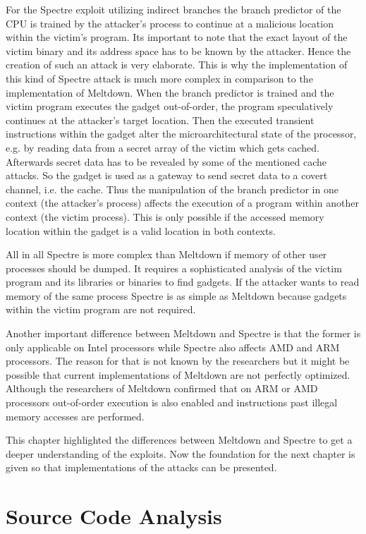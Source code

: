 \documentclass[a4paper,oneside,openright] {scrreprt}
\begin{document}
For the Spectre exploit utilizing indirect branches the branch predictor of the CPU is trained by the attacker's process 
to continue at a malicious location within the victim's program. 
Its important to note that the exact layout of the victim binary and its address space has to be known by the attacker.
Hence the creation of such an attack is very elaborate.
This is why the implementation of this kind of Spectre attack is much more complex in comparison to the implementation of Meltdown.
When the branch predictor is trained and the victim program executes the gadget out-of-order, 
the program speculatively continues at the attacker's target location.
Then the executed transient instructions within the gadget alter the microarchitectural state of the processor, e.g.
by reading data from a secret array of the victim which gets cached.
Afterwards secret data has to be revealed by some of the mentioned cache attacks.
So the gadget is used as a gateway to send secret data to a covert channel, i.e. the cache.
Thus the manipulation of the branch predictor in one context (the attacker's process) affects the execution of a program
within another context (the victim process). 
This is only possible if the accessed memory location within the gadget is a valid location in both contexts.

All in all Spectre is more complex than Meltdown if memory of other user processes should be dumped.
It requires a sophisticated analysis of the victim program and its libraries or binaries to find gadgets.
If the attacker wants to read memory of the same process Spectre is as simple as Meltdown because gadgets within the victim program
are not required.

Another important difference between Meltdown and Spectre is that the former is only applicable on Intel processors while Spectre 
also affects AMD and ARM processors. The reason for that is not known by the researchers but it might be possible that current 
implementations of Meltdown are not perfectly optimized. Although the researchers of Meltdown confirmed that on ARM or AMD processors
out-of-order execution is also enabled and instructions past illegal memory accesses are performed. 

This chapter highlighted the differences between Meltdown and Spectre to get a deeper understanding of the exploits.
Now the foundation for the next chapter is given so that implementations of the attacks can be presented.

\chapter{Source Code Analysis}
\label{ch:sourceCodeAnalysis}
\end{document}

